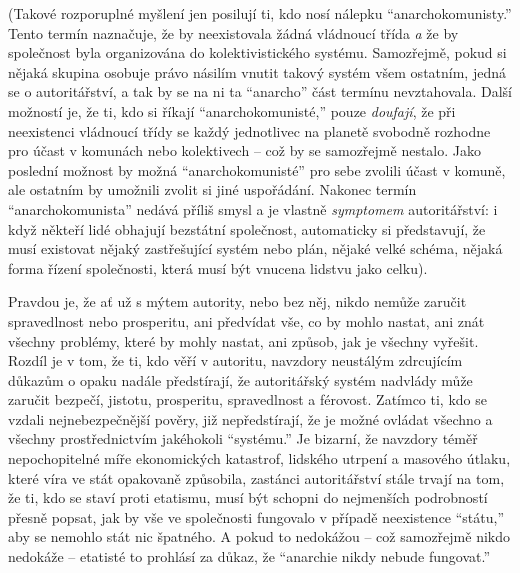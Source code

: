 \documentclass{book}
\begin{document}
(Takové rozporuplné myšlení jen posilují ti, kdo nosí nálepku \enquote{anarchokomunisty.} Tento termín naznačuje, že by neexistovala žádná vládnoucí třída \emph{a} že by společnost byla organizována do kolektivistického systému. Samozřejmě, pokud si nějaká skupina osobuje právo násilím vnutit takový systém všem ostatním, jedná se o autoritářství, a tak by se na ni ta \enquote{anarcho} část termínu nevztahovala. Další možností je, že ti, kdo si říkají \enquote{anarchokomunisté,} pouze \emph{doufají}, že při neexistenci vládnoucí třídy se každý jednotlivec na planetě svobodně rozhodne pro účast v komunách nebo kolektivech -- což by se samozřejmě nestalo. Jako poslední možnost by možná \enquote{anarchokomunisté} pro sebe zvolili účast v komuně, ale ostatním by umožnili zvolit si jiné uspořádání. Nakonec termín \enquote{anarchokomunista} nedává příliš smysl a je vlastně \emph{symptomem} autoritářství: i když někteří lidé obhajují bezstátní společnost, automaticky si představují, že musí existovat nějaký zastřešující systém nebo plán, nějaké velké schéma, nějaká forma řízení společnosti, která musí být vnucena lidstvu jako celku).

Pravdou je, že ať už s mýtem autority, nebo bez něj, nikdo nemůže zaručit spravedlnost nebo prosperitu, ani předvídat vše, co by mohlo nastat, ani znát všechny problémy, které by mohly nastat, ani způsob, jak je všechny vyřešit. Rozdíl je v tom, že ti, kdo věří v autoritu, navzdory neustálým zdrcujícím důkazům o opaku nadále předstírají, že autoritářský systém nadvlády může zaručit bezpečí, jistotu, prosperitu, spravedlnost a férovost. Zatímco ti, kdo se vzdali nejnebezpečnější pověry, již nepředstírají, že je možné ovládat všechno a všechny prostřednictvím jakéhokoli \enquote{systému.} Je bizarní, že navzdory téměř nepochopitelné míře ekonomických katastrof, lidského utrpení a masového útlaku, které víra ve stát opakovaně způsobila, zastánci autoritářství stále trvají na tom, že ti, kdo se staví proti etatismu, musí být schopni do nejmenších podrobností přesně popsat, jak by vše ve společnosti fungovalo v případě neexistence \enquote{státu,} aby se nemohlo stát nic špatného. A pokud to nedokážou -- což samozřejmě nikdo nedokáže -- etatisté to prohlásí za důkaz, že \enquote{anarchie nikdy nebude fungovat.}
\end{document}
